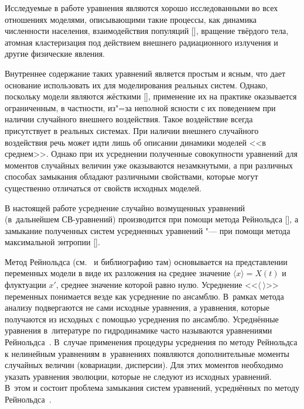 
\date{14/XI/2012}

\maketitle

Исследуемые в работе уравнения являются хорошо исследованными во всех отношениях моделями, описывающими такие процессы, как динамика численности населения, взаимодействия популяций [], вращение
твёрдого тела, атомная кластеризация под действием внешнего радиационного излучения и другие физические явления.

Внутреннее содержание таких уравнений является простым и ясным, что дает основание использовать их для моделирования реальных систем. Однако, поскольку модели являются жёсткими  [], применение их на практике
оказывается ограниченным, в частности, из"=за неполной ясности с их поведением при наличии случайного внешнего воздействия. 
Такое воздействие всегда присутствует в реальных системах. 
При наличии внешнего случайного воздействия речь может идти лишь об описании динамики моделей <<в среднем>>. 
Однако при их усреднении полученные совокупности уравнений для моментов случайных величин уже оказываются незамкнутыми, а при различных способах замыкания обладают различными свойствами, которые могут существенно отличаться от свойств исходных моделей.

В настоящей работе усреднение случайно возмущенных уравнений (в~дальнейшем СВ-уравнений) производится при помощи метода Рейнольдса [], а замыкание полученных систем усредненных уравнений "--- при помощи метода максимальной энтропии [].

\smallskip

Метод Рейнольдса (см.~\cite{zhurmir:bib:Monin} и библиографию там) основывается на представлении переменных
модели в виде их разложения на среднее значение $\langle x \rangle = X(t)$ и флуктуации $x'$, среднее значение которой равно
нулю. Усреднение <<$\langle~\rangle$>> переменных понимается везде как усреднение по ансамблю. 
В~рамках метода анализу подвергаются не сами исходные уравнения, а уравнения, которые получаются из
исходных с помощью усреднения по ансамблю. Усреднённые уравнения в~литературе по гидродинамике часто называются уравнениями Рейнольдса~\cite{zhurmir:bib:Monin}. 
В~случае применения процедуры усреднения по методу Рейнольдса к нелинейным уравнениям в~уравнениях появляются дополнительные моменты случайных величин (ковариации, дисперсии). 
Для этих моментов необходимо указать уравнения эволюции, которые не следуют из исходных уравнений. 
В~этом и состоит проблема замыкания систем уравнений, усреднённых по методу Рейнольдса~\cite{zhurmir:bib:Monin}.

